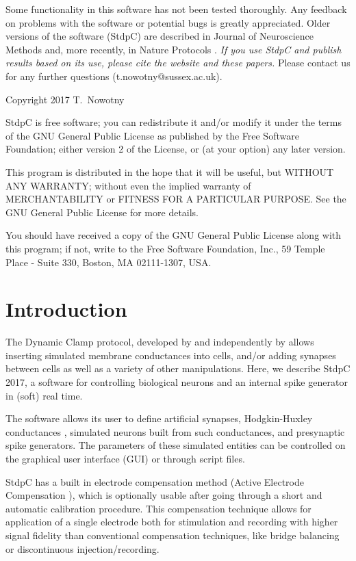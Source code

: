 \documentclass{article}
\begin{document}
Some functionality in this software has
not been tested thoroughly. Any feedback on problems with the
software or potential bugs is greatly appreciated.  Older versions
of the software (StdpC) are described in Journal of Neuroscience
Methods \cite{Nowotny2006} and, more recently, in Nature Protocols 
\cite{Kemenes2011}. {\em If you use StdpC and publish results
based on its use, please cite the website and these papers.} Please
contact us for any further questions (t.nowotny@sussex.ac.uk).

Copyright 2017 T.~Nowotny

StdpC is free software; you can redistribute it and/or modify  
it under the terms of the GNU General Public License as published by 
the Free Software Foundation; either version 2 of the License, or 
(at your option) any later version.                               

This program is distributed in the hope that it will be useful,
but WITHOUT ANY WARRANTY; without even the implied warranty of
MERCHANTABILITY or FITNESS FOR A PARTICULAR PURPOSE.  See the 
GNU General Public License for more details.

You should have received a copy of the GNU General Public License
along with this program; if not, write to the
Free Software Foundation, Inc., 59 Temple Place - Suite 330, Boston,
MA  02111-1307, USA.

\newpage
\section{Introduction}
           
The Dynamic Clamp protocol, developed by \cite{Sharp1993} and
independently by \cite{Robinson1993} allows inserting simulated
membrane conductances into cells, and/or adding synapses between cells
as well as a variety of other manipulations. Here, we describe StdpC
2017, a software for controlling biological neurons and an internal
spike generator in (soft) real time.

The software allows its user to define artificial synapses, Hodgkin-Huxley conductances
\cite{Hodgkin1949}, simulated neurons built from such conductances, and
presynaptic spike generators. The parameters of these simulated
entities can be controlled on the graphical user interface (GUI) or
through script files.  

StdpC has a built in electrode compensation method (Active
Electrode Compensation \cite{Brette2008}), which is optionally usable after
going through a short and automatic calibration procedure. This
compensation technique allows for application of a single electrode both
for stimulation and recording with higher signal fidelity than conventional
compensation techniques, like bridge balancing or discontinuous
injection/recording. 
\end{document}
